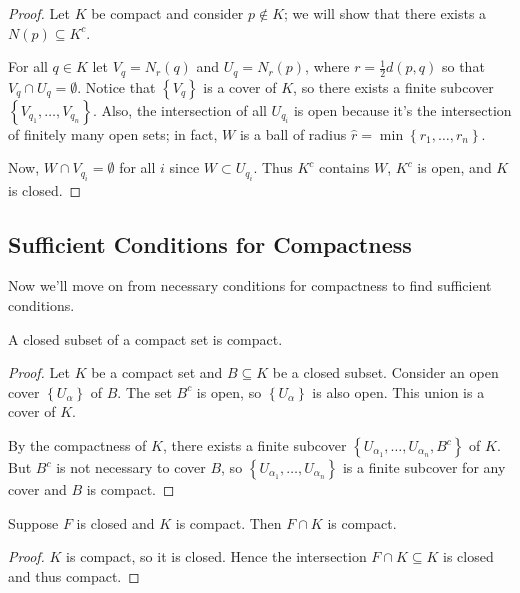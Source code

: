 \documentclass[../m131main.tex]{subfiles}
\begin{document}
\begin{proof}
    Let $K$ be compact and consider $p \not\in K$; we will show that there exists a $N(p) \subseteq K^c$.

    For all $q \in K$ let $V_q = N_r(q)$ and $U_q = N_r(p)$, where $r = \frac{1}{2} d(p,q)$ so that $V_q \cap U_q = \emptyset$.
    Notice that $\left\{ V_q \right\}$ is a cover of $K$, so there exists a finite subcover $\left\{ V_{q_1} , \ldots, V_{q_n}\right\}$.
    Also, the intersection of all $U_{q_i}$ is open because it's the intersection of finitely many open sets; in fact, $W$ is a ball of radius $\hat r = \min \left\{ r_1, \ldots, r_n \right\}$.

    Now, $W \cap V_{q_i} = \emptyset$ for all $i$ since $W \subset U_{q_i}$.
    Thus $K^c$ contains $W$, $K^c$ is open, and $K$ is closed.
\end{proof}

\subsection*{Sufficient Conditions for Compactness}
Now we'll move on from necessary conditions for compactness to find sufficient conditions.

\begin{theorem}[]
    A closed subset of a compact set is compact.
\end{theorem}

\begin{proof}
    Let $K$ be a compact set and $B \subseteq K$ be a closed subset.
    Consider an open cover $\left\{ U_\alpha \right\}$ of $B$.
    The set $B^c$ is open, so $\left\{ U_\alpha \right\}$ is also open.
    This union is a cover of $K$.

    By the compactness of $K$, there exists a finite subcover $\left\{ U_{\alpha_1}, \ldots, U_{\alpha_n}, B^c \right\}$ of $K$.
    But $B^c$ is not necessary to cover $B$, so $\left\{ U_{\alpha_1}, \ldots, U_{\alpha_n} \right\}$ is a finite subcover for any cover and $B$ is compact.
\end{proof}

\begin{corollary}[]
    Suppose $F$ is closed and $K$ is compact.
    Then $F \cap K$ is compact.
\end{corollary}

\begin{proof}
    $K$ is compact, so it is closed.
    Hence the intersection $F \cap K \subseteq K$ is closed and thus compact.
\end{proof}
\end{document}
